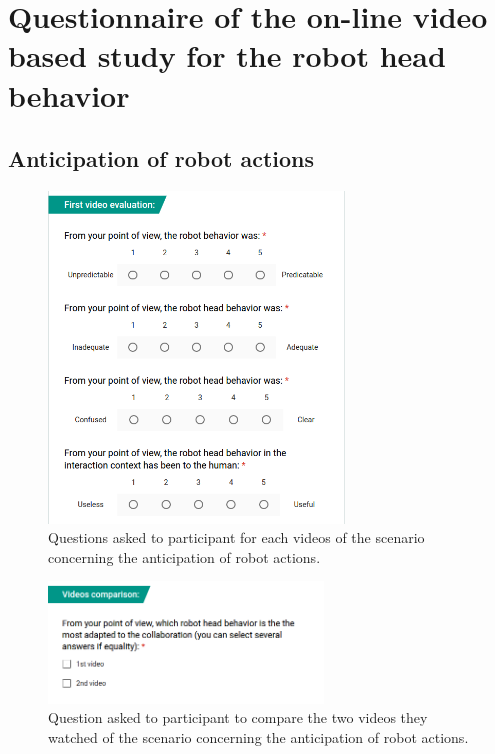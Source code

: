 \chapter{Questionnaire of the on-line video based study for the robot head behavior}
\label{chap:annexe2}

\section{Anticipation of robot actions}

\begin{figure}[!h]
	\centering
    \includegraphics[width=0.7\textwidth]{figs/Chapter6/QuestionsSce1.png}
    \caption{Questions asked to participant for each videos of the scenario concerning the anticipation of robot actions.}
    \label{fig:QuestionsSce1}
\end{figure}

\begin{figure}[!h]
	\centering
    \includegraphics[width=0.65\textwidth]{figs/Chapter6/ComparaisonSce1.png}
    \caption{Question asked to participant to compare the two videos they watched of the scenario concerning the anticipation of robot actions.}
    \label{fig:ComparaisonSce1}
\end{figure}

